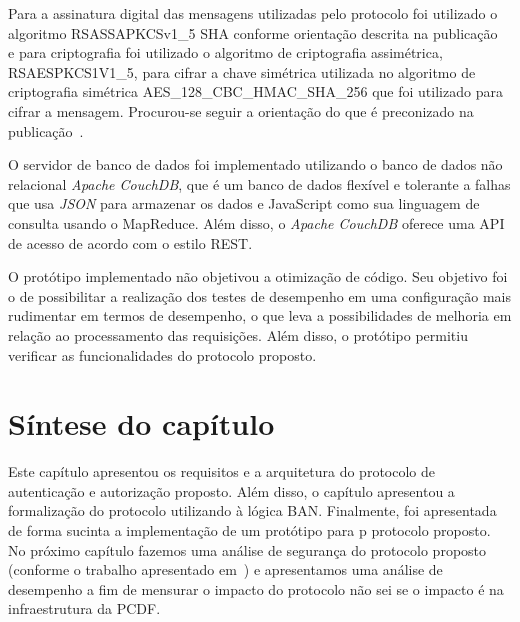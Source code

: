 Para a assinatura digital das mensagens utilizadas pelo protocolo foi utilizado o algoritmo RSASSA\-PKCS\-v1\_5 SHA conforme orientação descrita na publicação~\cite{ietfjws} e para criptografia foi utilizado o algoritmo de criptografia assimétrica, RSAES\-PKCS1\-V1\_5, para cifrar a chave simétrica utilizada no algoritmo de criptografia simétrica AES\_128\_CBC\_HMAC\_SHA\_256 que foi utilizado para cifrar a mensagem. Procurou-se seguir a orientação do que é preconizado na publicação~\cite{jwt2014}.

O servidor de banco de dados foi implementado utilizando o banco de dados não relacional \emph{Apache CouchDB}, que é um banco de dados flexível e tolerante a falhas que usa \emph{JSON} para armazenar os dados e JavaScript como sua linguagem de consulta usando o MapReduce. Além disso, o \emph{Apache CouchDB}
oferece uma API de acesso de acordo com o estilo REST.

O protótipo implementado não objetivou a otimização de c\'{o}digo. Seu objetivo foi o de possibilitar a realização dos testes de desempenho em uma configura\c c\~{a}o
mais rudimentar em termos de desempenho, o que leva a possibilidades de melhoria em rela\c c\~{a}o ao processamento das requisi\c c\~{o}es.
Al\'{e}m disso, o prot\'{o}tipo permitiu verificar as funcionalidades do protocolo proposto.


\section{Síntese do capítulo}

Este capítulo apresentou os requisitos e a arquitetura do protocolo de autenticação e autorização proposto. Além disso,  o capítulo apresentou a formalização do protocolo utilizando à lógica BAN. Finalmente, foi apresentada de forma sucinta a implementação de um protótipo para p protocolo proposto. No próximo capítulo fazemos uma
análise de seguran\c ca do protocolo proposto
(conforme o trabalho apresentado em~\cite{traust08}) e apresentamos uma an\'{a}lise de
desempenho a fim de mensurar o impacto do protocolo {\color{red}n\~{a}o sei se o impacto \'{e}}
na infraestrutura da PCDF.